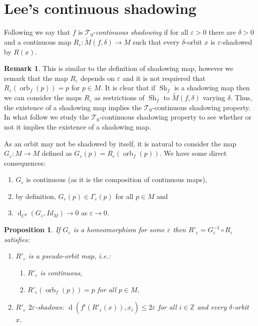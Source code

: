 \documentclass[12pt]{amsart}
\theoremstyle{plain}
\newtheorem{prop}[thm]{Proposition}
\theoremstyle{definition}
\newtheorem{rmk}[thm]{Remark}
\theoremstyle{remark}
\DeclareMathOperator{\dist}{d}
\DeclareMathOperator{\orb}{orb}
\DeclareMathOperator{\shm}{Sh}
\newcommand{\Z}{\mathbb Z}
\renewcommand{\epsilon}{\varepsilon}
\newcommand{\tM}{\tilde{M}}
\begin{document}
\section{Lee's continuous shadowing}
\label{secLeeCSh}
Following \cite{Lee03} we say that $f$ is $\mathcal{T}_0$-\textit{continuous shadowing}
if for all $\epsilon>0$ there are $\delta>0$ and a continuous map
$R_\epsilon\colon \tM(f,\delta)\to M$ such that
every $\delta$-orbit $x$ is $\epsilon$-shadowed by $R(x)$.

\begin{rmk}
 This is similar to the definition of shadowing map, however we remark that the map $R_\epsilon$ depends on $\epsilon$ and it is not requiered that $R_\epsilon(\orb_f(p))=p$ for $p\in M$.
 It is clear that if $\shm_f$ is a shadowing map then we can consider the maps $R_\epsilon$ as restrictions of $\shm_f$ to $\tM(f,\delta)$ varying $\delta$. Thus, the existence of a shadowing map implies the
 $\mathcal{T}_0$-continuous shadowing property.
 In what follow we study the
  $\mathcal{T}_0$-continuous shadowing property
  to see whether or not it implies the existence of a shadowing map.
\end{rmk}

As an orbit may not be shadowed by itself, it is natural to consider the map $G_\epsilon\colon M\to M$ defined as
$G_\epsilon(p)=R_\epsilon(\orb_f(p))$. We have some direct consequences:
\begin{enumerate}
\item $G_\epsilon$ is continuous (as it is the composition of continuous maps),
\item by definition, $G_\epsilon(p)\in \Gamma_\epsilon(p)$ for all $p\in M$ and
\item $\dist_{C^0}(G_\epsilon,Id_M)\to 0$ as $\epsilon\to 0$.
\end{enumerate}

\begin{prop}
\label{propCorrLeeCS}
 If $G_\epsilon$ is a homeomorphism for some $\epsilon$ then
 $R'_\epsilon=G_\epsilon^{-1}\circ R_\epsilon$ satisfies:
 \begin{enumerate}
 \item $R'_\epsilon$ is a pseudo-orbit map, \textit{i.e.}:
\begin{enumerate}
  \item $R'_\epsilon$ is continuous,
  \item $R'_\epsilon(\orb_f(p))=p$ for all $p\in M$,
\end{enumerate}
  \item $R'_\epsilon$ $2\epsilon$-shadows: $\dist(f^i(R'_\epsilon(x)),x_i)\leq 2\epsilon$ for all $i\in\Z$ and every $\delta$-orbit $x$.
 \end{enumerate}
\end{prop}
\end{document}
